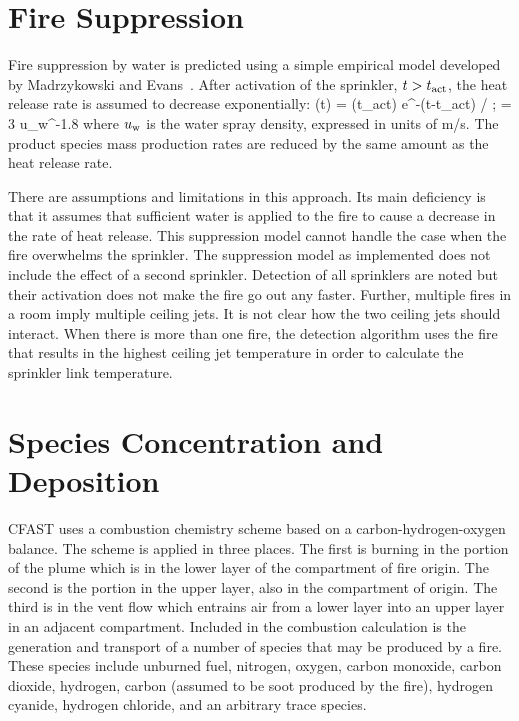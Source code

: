 \section{Fire Suppression} \label{sec:suppression}

Fire suppression by water is predicted using a simple empirical model developed by Madrzykowski \cite{Madrzykowski:1992} and Evans~\cite{Evans:1993}. After activation of the sprinkler, $t > t_{\rm act}$, the heat release rate is assumed to decrease exponentially:
\be
   \dQ(t) = \dQ(t_{\rm act}) \; {\rm e}^{-(t-t_{\rm act}) /\tau}   \quad ; \quad \tau = 3 u_{\rm w}^{-1.8}
\ee
where $u_{\rm w}$ is the water spray density, expressed in units of m/s. The product species mass production rates are reduced by the same amount as the heat release rate.

There are assumptions and limitations in this approach. Its main deficiency is that it assumes that sufficient water is applied to the fire to cause a decrease in the rate of heat release. This suppression model cannot handle the case when the fire overwhelms the sprinkler.  The suppression model as implemented does not include the effect of a second sprinkler. Detection of all sprinklers are noted but their activation does not make the fire go out any faster. Further, multiple fires in a room imply multiple ceiling jets. It is not clear how the two ceiling jets should interact. When there is more than one fire, the detection algorithm uses the fire that results in the highest ceiling jet temperature in order to calculate the sprinkler link temperature.

\section{Species Concentration and Deposition}

CFAST uses a combustion chemistry scheme based on a carbon-hydrogen-oxygen balance.  The scheme is applied in three places.  The first is burning in the portion of the plume which is in the lower layer of the compartment of fire origin.  The second is the portion in the upper layer, also in the compartment of origin.  The third is in the vent flow which entrains air from a lower layer into an upper layer in an adjacent compartment.  Included in the combustion calculation is the generation and transport of a number of species that may be produced by a fire.  These species include unburned fuel, nitrogen, oxygen, carbon monoxide, carbon dioxide, hydrogen, carbon (assumed to be soot produced by the fire), hydrogen cyanide, hydrogen chloride, and an arbitrary trace species.

